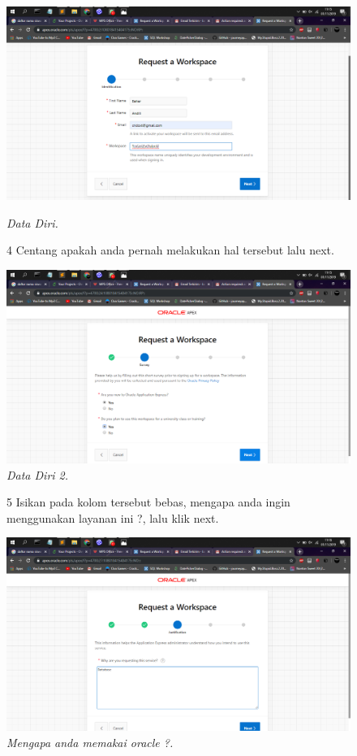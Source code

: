 \begin{enumerate}
\begin{figure}[!htbp]
    \begin{center}
\includegraphics[scale=0.2]{figures/2.png}
    \caption{\textit{Data Diri.}}
        \end{center}
        
\item[4]Centang apakah anda pernah melakukan hal tersebut lalu next.  

    \begin{center}
\includegraphics[scale=0.2]{figures/3.png}
    \caption{\textit{Data Diri 2.}}
        \end{center}
        \end{figure}
\begin{figure}
\item[5]Isikan pada kolom tersebut bebas, mengapa anda ingin menggunakan layanan ini ?, lalu klik next.

    \begin{center}
\includegraphics[scale=0.2]{figures/4.png}
    \caption{\textit{Mengapa anda memakai oracle ?.}}
        \end{center}


\end{figure}
\end{enumerate}
